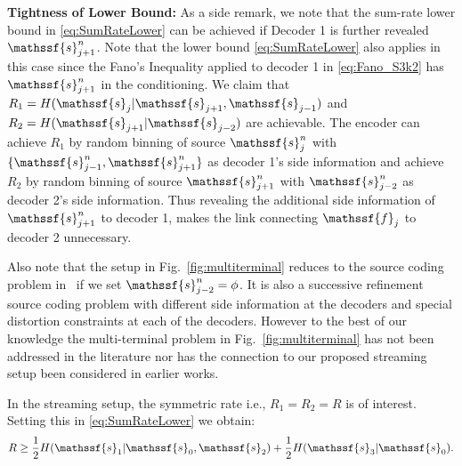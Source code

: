 \documentclass[journal, twocolumn, 10pt]{IEEEtran}
\newcommand{\rvf}{{\mathssf{f}}}    %
\newcommand{\rvs}{{\mathssf{s}}}    %
\begin{document}
{\bf Tightness of Lower Bound:} As a side remark, we note that the sum-rate lower bound in \eqref{eq:SumRateLower} can be achieved if Decoder 1 is further revealed $\rvs_{j+1}^n$. Note that the lower bound \eqref{eq:SumRateLower} also applies in this case since the Fano's Inequality applied to decoder 1 in \eqref{eq:Fano_S3k2} has $\rvs_{j+1}^n$ in the conditioning. We claim that $R_1 = H(\rvs_j|\rvs_{j+1},\rvs_{j-1})$ and $R_2 = H(\rvs_{j+1}|\rvs_{j-2})$ are achievable.  The encoder can achieve $R_1$ by  random binning of source $\rvs_{j}^n$ with $\{\rvs_{j-1}^n, \rvs_{j+1}^n\}$ as decoder 1's side information and achieve $R_2$ by random binning of source $\rvs_{j+1}^n$ with $\rvs^n_{j-2}$ as decoder 2's side information. Thus revealing the additional side information of $\rvs^n_{j+1}$ to decoder 1, makes the link connecting $\rvf_{j}$ to decoder 2 unnecessary.

 Also note that the setup in Fig.~\ref{fig:multiterminal} reduces to the source coding problem in~\cite{zigZag} if we set  $\rvs_{j-2}^{n} = \phi$.  It is also a successive refinement source coding problem with different side information at the decoders and special distortion constraints at each of the decoders. 
However to the best of our knowledge the multi-terminal problem in Fig.~\ref{fig:multiterminal} has  not been  addressed in the literature nor has the connection to our proposed streaming setup been considered in earlier works.

In the streaming setup, the symmetric rate i.e., $R_1=R_2=R$ is of interest. Setting this in \eqref{eq:SumRateLower} we obtain: 
\begin{equation}
R \ge \frac{1}{2}H(\rvs_1|\rvs_0,\rvs_2) + \frac{1}{2}H(\rvs_3|\rvs_0).\label{eq:R-MT-LB}
\end{equation}
\end{document}
